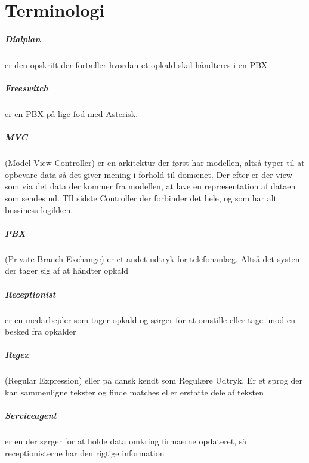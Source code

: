 \chapter{Terminologi}

\paragraph{Dialplan} er den opskrift der fortæller hvordan et opkald skal håndteres i en PBX

\paragraph{Freeswitch} er en PBX på lige fod med Asterisk.

\paragraph{MVC} (Model View Controller) er en arkitektur der først har modellen, altså typer til at opbevare data så det giver mening i forhold til domænet. Der efter er der view som via det data der kommer fra modellen, at lave en repræsentation af dataen som sendes ud. TIl sidste Controller der forbinder det hele, og som har alt bussiness logikken.

\paragraph{PBX} (Private Branch Exchange) er et andet udtryk for telefonanlæg. Altså det system der tager sig af at håndter opkald

\paragraph{Receptionist} er en medarbejder som tager opkald og sørger for at omstille eller tage imod en besked fra opkalder

\paragraph{Regex} (Regular Expression) eller på dansk kendt som Regulære Udtryk. Er et sprog der kan sammenligne tekster og finde matches eller erstatte dele af teksten

\paragraph{Serviceagent} er en der sørger for at holde data omkring firmaerne opdateret, så receptionisterne har den rigtige information
